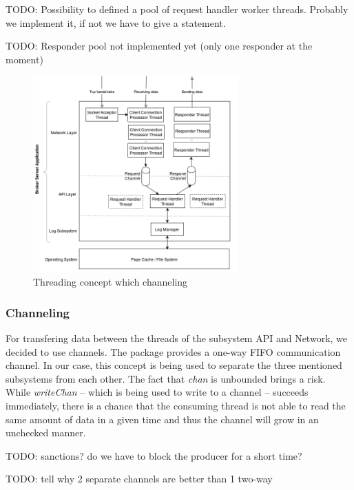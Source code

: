 TODO: Possibility to defined a pool of request handler worker threads.
Probably we implement it, if not we have to give a statement. 

TODO: Responder pool not implemented yet (only one responder at the moment)

\begin{figure}[H]
    \centering
    \includegraphics[width=0.7\textwidth]{images/design-threading.png}
    \caption{Threading concept which channeling}
    \label{fig:architecture-threading.png}
\end{figure}

\subsubsection{Channeling}
For transfering data between the threads of the subsystem API and Network, we
decided to use channels. The
package provides a one-way FIFO communication channel. In
our case, this concept is being used to separate the
three mentioned subsystems from each other. The fact that
\textit{chan} is unbounded brings a risk. While
\textit{writeChan} -- which is being used to write to a
channel -- succeeds immediately, there is a chance that the
consuming thread is not able to read the same amount of
data in a given time and thus the channel will grow in
an unchecked manner. \cite{o2008real}

TODO: sanctions? do we have to block the producer for a short time?

TODO: tell why 2 separate channels are better than 1 two-way

